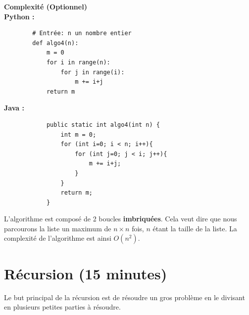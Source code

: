 \begin{Exercice}[10 minutes] \textbf{Complexité (Optionnel)} \\        
        \textbf{Python :}
        \begin{verbatim}
        # Entrée: n un nombre entier
        def algo4(n):
            m = 0
            for i in range(n):
                for j in range(i):
                    m += i+j
            return m
        \end{verbatim}
        
        \textbf{Java :}
        \begin{verbatim}
            public static int algo4(int n) {
                int m = 0;
                for (int i=0; i < n; i++){
                    for (int j=0; j < i; j++){
                        m += i+j;
                    }
                }
                return m;
            }
        \end{verbatim}
    \begin{solution} 
    L'algorithme est composé de 2 boucles \textbf{imbriquées}. Cela veut dire que nous parcourons la liste un maximum de $n \times n$ fois, $n$ étant la taille de la liste. La complexité de l'algorithme est ainsi $O(n^2)$.
    \end{solution}
    
\end{Exercice}
    
        
\section{Récursion (15 minutes)}

Le but principal de la récursion est de résoudre un gros problème en le divisant en plusieurs petites parties à résoudre.

